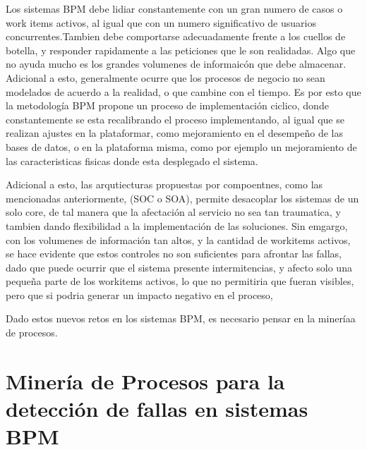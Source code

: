 Los sistemas BPM debe lidiar constantemente con un gran numero de casos o work items activos, al igual que con un numero significativo de usuarios concurrentes.Tambien debe comportarse adecuadamente frente a los cuellos de botella, y responder rapidamente a las peticiones que le son realidadas. Algo que no ayuda mucho es los grandes volumenes de informaicón que debe almacenar. Adicional a esto, generalmente ocurre que los procesos de negocio no sean modelados de acuerdo a la realidad, o que cambine con el tiempo. Es por esto que la metodología BPM propone un proceso de implementación ciclico, donde constantemente se esta recalibrando el proceso implementando, al igual que se realizan ajustes en la plataformar, como mejoramiento en el desempeño de las bases de datos, o en la plataforma misma, como por ejemplo un mejoramiento de las caracteristicas fisicas donde esta desplegado el sistema. 

Adicional a esto, las arqutiecturas propuestas por compoentnes, como las mencionadas anteriormente, (SOC o SOA), permite desacoplar los sistemas de un solo core, de tal manera que la afectación al servicio no sea tan traumatica, y tambien dando flexibilidad a la implementación de las soluciones. Sin emgargo, con los volumenes de información tan altos, y la cantidad de workitems activos, se hace evidente que estos controles no son suficientes para afrontar las fallas, dado que puede ocurrir que el sistema presente intermitencias, y afecto solo una pequeña parte de los workitems activos, lo que no permitiria que fueran visibles, pero que si podria generar un impacto negativo en el proceso, 



Dado estos nuevos retos en los sistemas BPM, es necesario pensar en la mineríaa de procesos.










\section{Minería de Procesos para la detección de fallas en sistemas BPM} %
\label{section1.3}

